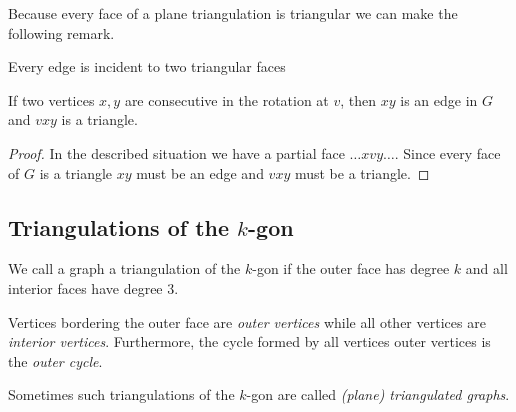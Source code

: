 Because every face of a plane triangulation is triangular we can make the following remark.

\begin{remark}
  Every edge is incident to two triangular faces
\end{remark}

\begin{lemma}
  \label{lm:prelim:rotationEdge}
  If two vertices $x, y$ are consecutive in the rotation at $v$, then $xy$ is an edge in $G$ and $vxy$ is a triangle.
\end{lemma}
\begin{proof}
  In the described situation we have a partial face $\ldots x v y \ldots$.  Since every face of $G$ is a triangle $xy$ must be an edge and $vxy$ must be a triangle.
\end{proof}

\subsection{Triangulations of the $k$-gon}

\begin{defi}
We call a graph a triangulation of the $k$-gon if the outer face has degree $k$ and all interior faces have degree $3$.
\end{defi}
Vertices bordering the outer face are \emph{outer vertices} while all other vertices are \emph{interior vertices}. Furthermore, the cycle formed by all vertices outer vertices is the \emph{outer cycle}.

Sometimes such triangulations of the $k$-gon are called \emph{(plane) triangulated graphs}.

